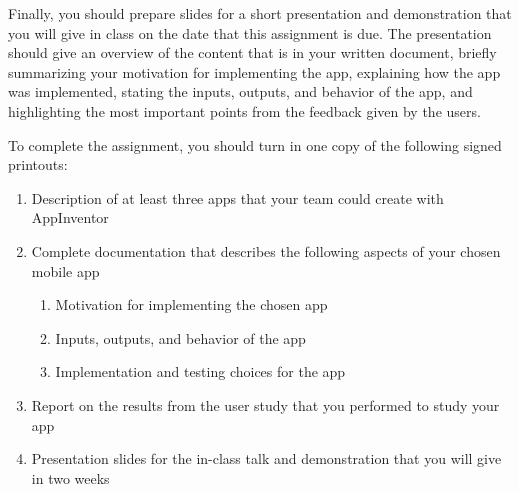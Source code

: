 Finally, you should prepare slides for a short presentation and demonstration that you will give in class on the date
that this assignment is due.  The presentation should give an overview of the content that is in your written document,
briefly summarizing your motivation for implementing the app, explaining how the app was implemented, stating the inputs,
outputs, and behavior of the app, and highlighting the most important points from the feedback given by the users.


\noindent
To complete the assignment, you should turn in one copy of the following signed printouts: 
\vspace*{-.1in}
\begin{enumerate}
    \itemsep0em

	\item Description of at least three apps that your team could create with AppInventor
		
	\item Complete documentation that describes the following aspects of your chosen mobile app

\vspace*{-.05in}
\begin{enumerate}
	\item Motivation for implementing the chosen app
	\item Inputs, outputs, and behavior of the app
	\item Implementation and testing choices for the app
\end{enumerate}
\vspace*{-.05in}

	\item Report on the results from the user study that you performed to study your app

	\item Presentation slides for the in-class talk and demonstration that you will give in two weeks

\end{enumerate}


